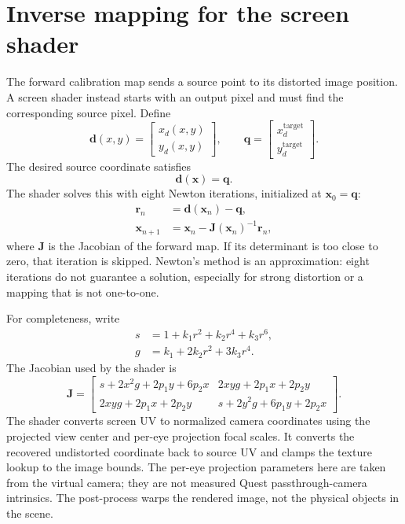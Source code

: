 \documentclass[11pt,a4paper]{article}
\begin{document}
\section{Inverse mapping for the screen shader}
The forward calibration map sends a source point to its distorted image
position. A screen shader instead starts with an output pixel and must find
the corresponding source pixel. Define
\begin{equation}
  \mathbf{d}(x,y)=
  \begin{bmatrix}x_d(x,y)\\y_d(x,y)\end{bmatrix},
  \qquad
  \mathbf{q}=
  \begin{bmatrix}x_d^{\mathrm{target}}\\y_d^{\mathrm{target}}\end{bmatrix}.
\end{equation}
The desired source coordinate satisfies
\begin{equation}
  \mathbf{d}(\mathbf{x})=\mathbf{q}.
\end{equation}
The shader solves this with eight Newton iterations, initialized at
$\mathbf{x}_0=\mathbf{q}$:
\begin{align}
  \mathbf{r}_n &= \mathbf{d}(\mathbf{x}_n)-\mathbf{q},\\
  \mathbf{x}_{n+1} &=
  \mathbf{x}_n-\mathbf{J}(\mathbf{x}_n)^{-1}\mathbf{r}_n,
\end{align}
where $\mathbf{J}$ is the Jacobian of the forward map. If its determinant is
too close to zero, that iteration is skipped. Newton's method is an
approximation: eight iterations do not guarantee a solution, especially for
strong distortion or a mapping that is not one-to-one.

For completeness, write
\begin{align}
  s &= 1+k_1r^2+k_2r^4+k_3r^6,\\
  g &= k_1+2k_2r^2+3k_3r^4.
\end{align}
The Jacobian used by the shader is
\begin{equation}
\mathbf{J}=
\begin{bmatrix}
s+2x^2g+2p_1y+6p_2x &
2xyg+2p_1x+2p_2y\\
2xyg+2p_1x+2p_2y &
s+2y^2g+6p_1y+2p_2x
\end{bmatrix}.
\end{equation}
The shader converts screen UV to normalized camera coordinates using the
projected view center and per-eye projection focal scales. It converts the
recovered undistorted coordinate back to source UV and clamps the texture
lookup to the image bounds.
The per-eye projection parameters here are taken from the virtual camera;
they are not measured Quest passthrough-camera intrinsics. The post-process
warps the rendered image, not the physical objects in the scene.
\end{document}
